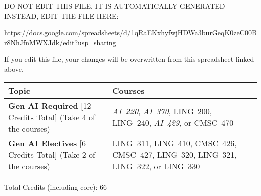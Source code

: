 
DO NOT EDIT THIS FILE, IT IS AUTOMATICALLY GENERATED
INSTEAD, EDIT THE FILE HERE:

https://docs.google.com/spreadsheets/d/1qRaEKxhyfwjHDWa3burGeqK0zeC00Br8NhJfnMWXJdk/edit?usp=sharing

If you edit this file, your changes will be overwritten from this spreadsheet
linked above.

\begin{longtable}{p{7cm}>{\raggedleft\arraybackslash}p{7cm}}
Topic & Courses \\
\toprule
\textbf{Gen AI Required} [12 Credits Total] (Take 4 of the courses) & \textit{AI~220}, \textit{AI~370}, LING~200, LING~240, \textit{AI~429}, or CMSC~470 \\
\textbf{Gen AI Electives} [6 Credits Total] (Take 2 of the courses) & LING~311, LING~410, CMSC~426, CMSC~427, LING~320, LING~321, LING~322, or LING~330 \\
\bottomrule
\end{longtable}
Total Credits (including core): 66
